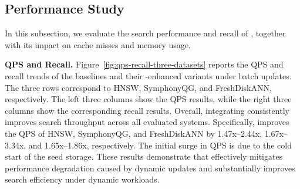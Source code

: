 






\subsection{Performance Study}
In this subsection, we evaluate the search performance and recall of \system, together with its impact on cache misses and memory usage.

\noindent \textbf{QPS and Recall.} Figure~\ref{fig:qps-recall-three-datasets} reports the QPS and recall trends of the baselines and their \system-enhanced variants under batch updates. The three rows correspond to HNSW, SymphonyQG, and FreshDiskANN, respectively. The left three columns show the QPS results, while the right three columns show the corresponding recall results. Overall, integrating \system consistently improves search throughput across all evaluated systems. Specifically, \system improves the QPS of HNSW, SymphonyQG, and FreshDiskANN by 1.47x--2.44x, 1.67x--3.34x, and 1.65x--1.86x, respectively. The initial surge in QPS is due to the cold start of the seed storage. These results demonstrate that \system effectively mitigates performance degradation caused by dynamic updates and substantially improves search efficiency under dynamic workloads.

